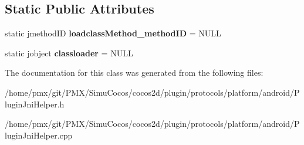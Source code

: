 \subsection*{Static Public Attributes}
\begin{DoxyCompactItemize}
\item 
\mbox{\label{classcocos2d_1_1PluginJniHelper_af8d770d978aa3c41d2f3690cac30651e}} 
static jmethod\+ID {\bfseries loadclass\+Method\+\_\+method\+ID} = N\+U\+LL
\item 
\mbox{\label{classcocos2d_1_1PluginJniHelper_a3c77c75f1ea2fe5f1b564daf0e747283}} 
static jobject {\bfseries classloader} = N\+U\+LL
\end{DoxyCompactItemize}


The documentation for this class was generated from the following files\+:\begin{DoxyCompactItemize}
\item 
/home/pmx/git/\+P\+M\+X/\+Simu\+Cocos/cocos2d/plugin/protocols/platform/android/Plugin\+Jni\+Helper.\+h\item 
/home/pmx/git/\+P\+M\+X/\+Simu\+Cocos/cocos2d/plugin/protocols/platform/android/Plugin\+Jni\+Helper.\+cpp\end{DoxyCompactItemize}
